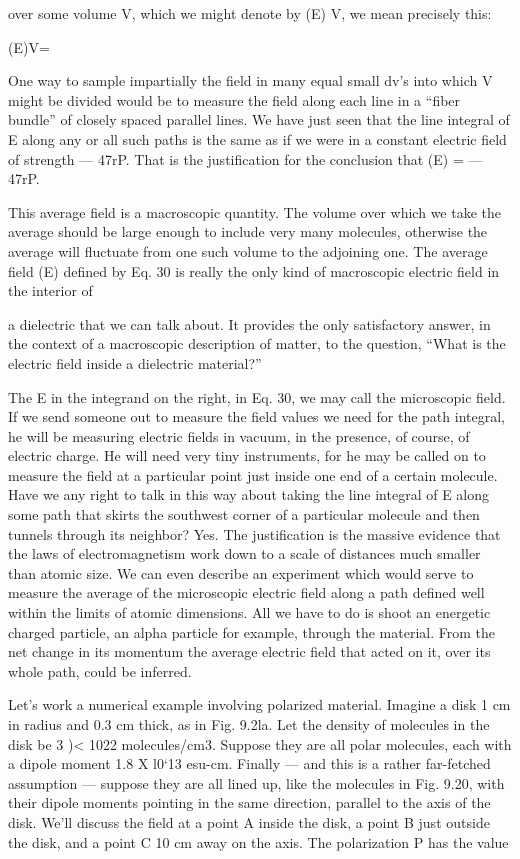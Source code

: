 over some volume V, which we might denote by (E) V, we mean
precisely this:

\begin{equation}
\end{equation}
(E)V=%

One way to sample impartially the field in many equal small dv's
into which V might be divided would be to measure the field along
each line in a ``fiber bundle'' of closely spaced parallel lines. We
have just seen that the line integral of E along any or all such paths
is the same as if we were in a constant electric field of strength  ---  47rP.
That is the justification for the conclusion that (E) =  --- 47rP.

This average field is a macroscopic quantity. The volume over
which we take the average should be large enough to include very
many molecules, otherwise the average will fluctuate from one such
volume to the adjoining one. The average field (E) defined by Eq. 30
is really the only kind of macroscopic electric field in the interior of

a dielectric that we can talk about. It provides the only satisfactory
answer, in the context of a macroscopic description of matter, to the
question, ``What is the electric field inside a dielectric material?''

The E in the integrand on the right, in Eq. 30, we may call the
microscopic field. If we send someone out to measure the field values
we need for the path integral, he will be measuring electric fields in
vacuum, in the presence, of course, of electric charge. He will need
very tiny instruments, for he may be called on to measure the field
at a particular point just inside one end of a certain molecule. Have
we any right to talk in this way about taking the line integral of E
along some path that skirts the southwest corner of a particular
molecule and then tunnels through its neighbor? Yes. The justification
is the massive evidence that the laws of electromagnetism work
down to a scale of distances much smaller than atomic size. We can
even describe an experiment which would serve to measure the
average of the microscopic electric field along a path defined well
within the limits of atomic dimensions. All we have to do is shoot
an energetic charged particle, an alpha particle for example, through
the material. From the net change in its momentum the average
electric field that acted on it, over its whole path, could be inferred.

Let's work a numerical example involving polarized material.
Imagine a disk 1 cm in radius and 0.3 cm thick, as in Fig. 9.2la. Let
the density of molecules in the disk be 3 )< 1022 molecules/cm3.
Suppose they are all polar molecules, each with a dipole moment
1.8 X l0‘13 esu-cm. Finally --- and this is a rather far-fetched
assumption --- suppose they are all lined up, like the molecules in
Fig. 9.20, with their dipole moments pointing in the same direction,
parallel to the axis of the disk. We'll discuss the field at a point A
inside the disk, a point B just outside the disk, and a point C 10 cm
away on the axis. The polarization P has the value


